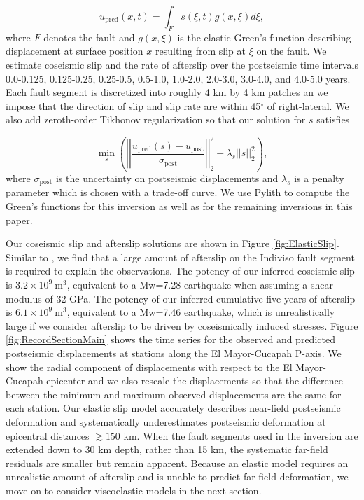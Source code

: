 \documentclass[draft,linenumbers]{AGUJournal}
\begin{document}
\begin{equation}\label{eq:ElasticForward}
  u_\mathrm{pred}(x,t) = \int_F s(\xi,t)g(x,\xi)d\xi, 
\end{equation}           
where $F$ denotes the fault and $g(x,\xi)$ is the elastic Green's function describing displacement at surface position $x$ resulting from slip at $\xi$ on the fault.  We estimate coseismic slip and the rate of afterslip over the postseismic time intervals 0.0-0.125, 0.125-0.25, 0.25-0.5, 0.5-1.0, 1.0-2.0, 2.0-3.0, 3.0-4.0, and 4.0-5.0 years.  Each fault segment is discretized into roughly 4 km by 4 km patches an we impose that the direction of slip and slip rate are within 45$^\circ$ of right-lateral. We also add zeroth-order Tikhonov regularization so that our solution for $s$ satisfies

\begin{equation}\label{eq:ElasticObjective}
  \min_s \left(\left|\left|\frac{u_\mathrm{pred}(s) - u_\mathrm{post}}                
                                {\sigma_\mathrm{post}}\right|\right|_2^2 + 
                                \lambda_s||s||_2^2\right),
\end{equation}
where $\sigma_\mathrm{post}$ is the uncertainty on postseismic displacements and $\lambda_s$ is a penalty parameter which is chosen with a trade-off curve.  We use Pylith \citep{Aagaard2013} to compute the Green's functions for this inversion as well as for the remaining inversions in this paper. 

Our coseismic slip and afterslip solutions are shown in Figure \ref{fig:ElasticSlip}.  Similar to \citet{Rollins2015}, we find that a large amount of afterslip on the Indiviso fault segment is required to explain the observations. The potency of our inferred coseismic slip is $3.2\times10^9\ \mathrm{m}^3$, equivalent to a Mw=7.28 earthquake when assuming a shear modulus of 32 GPa.  The potency of our inferred cumulative five years of afterslip is $6.1\times10^9\ \mathrm{m}^3$, equivalent to a Mw=7.46 earthquake, which is unrealistically large if we consider afterslip to be driven by coseismically induced stresses.  Figure \ref{fig:RecordSectionMain} shows the time series for the observed and predicted postseismic displacements at stations along the El Mayor-Cucapah P-axis.  We show the radial component of displacements with respect to the El Mayor-Cucapah epicenter and we also rescale the displacements so that the difference between the minimum and maximum observed displacements are the same for each station.  Our elastic slip model accurately describes near-field postseismic deformation and systematically underestimates postseismic deformation at epicentral distances ${\gtrsim}150$ km.  When the fault segments used in the inversion are extended down to 30 km depth, rather than 15 km, the systematic far-field residuals are smaller but remain apparent. Because an elastic model requires an unrealistic amount of afterslip and is unable to predict far-field deformation, we move on to consider viscoelastic models in the next section.  
\end{document}
